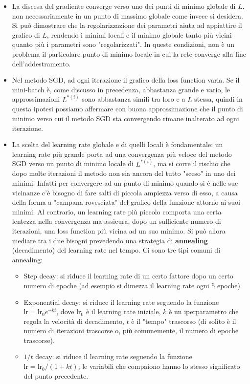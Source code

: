 \begin{itemize}

\item La discesa del gradiente converge verso uno dei punti di minimo globale di $L$, non necessariamente in un punto di massimo globale come invece si desidera. Si può dimostrare che la regolarizzazione dei parametri aiuta ad appiattire il grafico di $L$, rendendo i minimi locali e il minimo globale tanto più vicini quanto più i parametri sono "regolarizzati". In queste condizioni, non è un problema il particolare punto di minimo locale in cui la rete converge alla fine dell'addestramento.

\item Nel metodo SGD, ad ogni iterazione il grafico della loss function varia. Se il mini-batch è, come discusso in precedenza, abbastanza grande e vario, le approssimazioni $L^{*(i)}$ sono abbastanza simili tra loro e a $L$ stessa, quindi in questa ipotesi possiamo affermare con buona approssimazione che il punto di minimo verso cui il metodo SGD sta convergendo rimane inalterato ad ogni iterazione.

\item La scelta del learning rate globale e di quelli locali è fondamentale: un learning rate più grande porta ad una convergenza più veloce del metodo SGD verso un punto di minimo locale di $L^{*(i)}$, ma si corre il rischio che dopo molte iterazioni il metodo non sia ancora del tutto "sceso" in uno dei minimi. Infatti per convergere ad un punto di minimo quando si è nelle sue vicinanze c'è bisogno di fare salti di piccola ampiezza verso di esso, a causa della forma a "campana rovesciata" del grafico della funzione attorno ai suoi minimi. Al contrario, un learning rate più piccolo comporta una certa lentezza nella convergenza ma assicura, dopo un sufficiente numero di iterazioni, una loss function più vicina ad un suo minimo. Si può allora mediare tra i due bisogni prevedendo una strategia di \textbf{annealing} (decadimento) del learning rate nel tempo. Ci sono tre tipi comuni di annealing:

\begin{itemize}

\item Step decay: si riduce il learning rate di un certo fattore dopo un certo numero di epoche (ad esempio si dimezza il learning rate ogni 5 epoche)

\item Exponential decay: si riduce il learning rate seguendo la funzione $\text{lr}=\text{lr}_0 e^{-kt}$, dove $\text{lr}_0$ è il learning rate iniziale, $k$ è un iperparametro che regola la velocità di decadimento, $t$ è il "tempo" trascorso (di solito è il numero di iterazioni trascorse o, più comunemente, il numero di epoche trascorse).

\item $1/t$ decay: si riduce il learning rate seguendo la funzione $\text{lr}=\text{lr}_0 /(1+kt)$; le variabili che compaiono hanno lo stesso significato del punto precedente.

\end{itemize}

\end{itemize}
 
